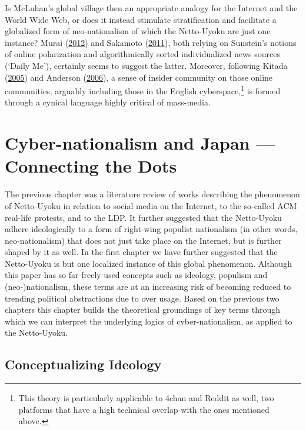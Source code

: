 \documentclass[10pt,british,A4paper,oneside]{memoir}
\begin{document}
Is McLuhan's global village then an appropriate analogy for the Internet
and the World Wide Web, or does it instead stimulate stratification and
facilitate a globalized form of neo-nationalism of which the Netto-Uyoku
are just one instance? Murai
(\protect\hyperlink{ref-murai_net_2012}{2012}) and Sakamoto
(\protect\hyperlink{ref-sakamoto_koreans_2011}{2011}), both relying on
Sunstein's notions of online polarization and algorithmically sorted individualized
news sources (`Daily Me'), certainly seems to suggest the latter.
Moreover, following Kitada
(\protect\hyperlink{ref-kitada_eng:_2005}{2005}) and Anderson
(\protect\hyperlink{ref-anderson_imagined_2006}{2006}), a sense of
insider community on those online communities, arguably including those
in the English cyberspace,\footnote{This theory is particularly
  applicable to 4chan and Reddit as well, two platforms that have a high
  technical overlap with the ones mentioned above.} is formed through a
cynical language highly critical of mass-media.

\chapter{Cyber-nationalism and Japan --- Connecting the
Dots}\label{cyber-nationalism-and-japan-connecting-the-dots}

The previous chapter was a literature review of works describing the
phenomenon of Netto-Uyoku in relation to social media on the Internet, to
the so-called ACM real-life protests, and to the LDP. It further suggested
that the Netto-Uyoku adhere ideologically to a form of right-wing
populist nationalism (in other words, neo-nationalism) that does not
just take place on the Internet, but is further shaped by it as well. In
the first chapter we have further suggested that the Netto-Uyoku is but one
localized instance of this global phenomenon. Although this paper has so
far freely used concepts such as ideology, populism and
(neo-)nationalism, these terms are at an increasing risk of becoming
reduced to trending political abstractions due to over usage. Based on
the previous two chapters this chapter builds the theoretical groundings
of key terms through which we can interpret the underlying logics of
cyber-nationalism, as applied to the Netto-Uyoku.

\section{Conceptualizing Ideology}\label{conceptualizing-ideology}
\end{document}
